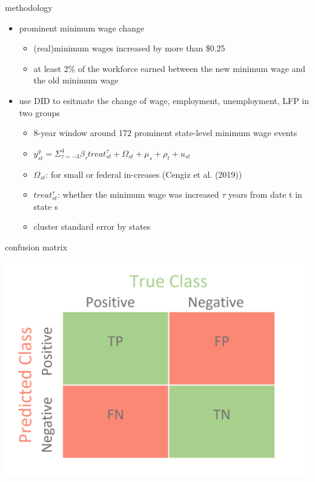 \documentclass[
  ignorenonframetext,
]{beamer}
\begin{document}
\begin{frame}{methodology}
\begin{itemize}
  \item prominent minimum wage change
  \begin{itemize}
    \item (real)minimum wages increased by more than \$0.25
    \item at least 2\% of the workforce earned between the new minimum wage and the old minimum wage
  \end{itemize}
  \item use DID to esitmate the change of wage, employment, unemployment, LFP in two groups
  \begin{itemize}
    \item 8-year window around 172 prominent state-level minimum wage events
    \item $y_{st}^g = \Sigma_{\tau=-3}^4 \beta_{\tau}treat_{st}^{\tau} + \Omega_{st} + \mu_s + \rho_t + u_{st}$
    \item $\Omega_{st}$: for small or federal in-creases (Cengiz et al. (2019))
    \item $treat_{st}^{\tau}$: whether the minimum wage was increased $\tau$ years from date t in state s
    \item cluster standard error by states
  \end{itemize}
\end{itemize}
  
\end{frame}


\begin{frame}{confusion matrix}
\begin{center}
  \includegraphics{figure/pdf/confustion_matrix.png}
\end{center}
\end{frame}
\end{document}
